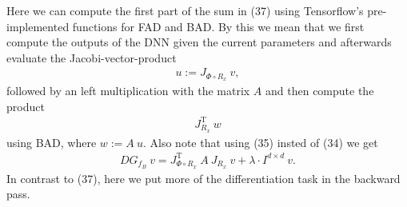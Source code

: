 \documentclass[conference]{IEEEtran}
\begin{document}
Here we can compute the first part of the sum in (37) using Tensorflow's pre-implemented functions for FAD and BAD. By this we mean that we first compute the outputs of the DNN given the current parameters and afterwards evaluate the Jacobi-vector-product 
\begin{align}
u := J_{\Phi\circ R _{x}}\:v,
\end{align}
followed by an left multiplication with the matrix $A$ and then compute the product 
\begin{align}
J_{R_{x}}^{\mathrm{T}}\:w
\end{align}
using BAD, where $w := A\:u$. Also note that using (35) insted of (34) we get 
\begin{align}
DG_{f_{B}}\:v  = J_{\Phi\circ R _{x}}^{\mathrm{T}}\:A\:J_{R _{x}}\:v + \lambda\cdot I^{d\times d}\:v.
\end{align}
In contrast to (37), here we put more of the differentiation task in the backward pass. 
\end{document}
